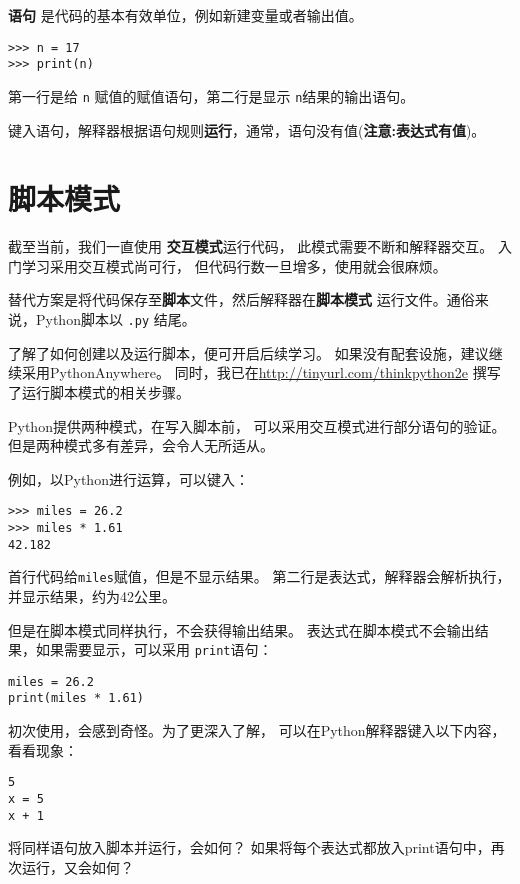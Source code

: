 \documentclass[10pt]{book}
\begin{document}
 {\bf 语句} 是代码的基本有效单位，例如新建变量或者输出值。

\begin{verbatim}
>>> n = 17
>>> print(n)
\end{verbatim}
%
第一行是给 {\tt n} 赋值的赋值语句，第二行是显示 {\tt n}结果的输出语句。

键入语句，解释器根据语句规则{\bf 运行}，通常，语句没有值({\bf 注意:表达式有值})。


\section{脚本模式}

截至当前，我们一直使用 {\bf 交互模式}运行代码，
此模式需要不断和解释器交互。
入门学习采用交互模式尚可行，
但代码行数一旦增多，使用就会很麻烦。

替代方案是将代码保存至{\bf 脚本}文件，然后解释器在{\bf 脚本模式}
运行文件。通俗来说，Python脚本以 {\tt .py} 结尾。

了解了如何创建以及运行脚本，便可开启后续学习。
如果没有配套设施，建议继续采用PythonAnywhere。
同时，我已在\url{http://tinyurl.com/thinkpython2e}
撰写了运行脚本模式的相关步骤。

Python提供两种模式，在写入脚本前，
可以采用交互模式进行部分语句的验证。
但是两种模式多有差异，会令人无所适从。

例如，以Python进行运算，可以键入：

\begin{verbatim}
>>> miles = 26.2
>>> miles * 1.61
42.182
\end{verbatim}

首行代码给{\tt miles}赋值，但是不显示结果。
第二行是表达式，解释器会解析执行，并显示结果，约为42公里。

但是在脚本模式同样执行，不会获得输出结果。
表达式在脚本模式不会输出结果，如果需要显示，可以采用 {\tt print}语句：

\begin{verbatim}
miles = 26.2
print(miles * 1.61)
\end{verbatim}

初次使用，会感到奇怪。为了更深入了解，
可以在Python解释器键入以下内容，看看现象：

\begin{verbatim}
5
x = 5
x + 1
\end{verbatim}

将同样语句放入脚本并运行，会如何？
如果将每个表达式都放入print语句中，再次运行，又会如何？
\end{document}
